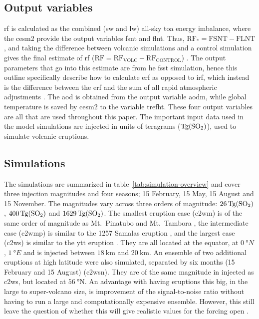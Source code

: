 \documentclass{ametsocV6.1}
\newcommand{\iso}[1][i]{{#1}njected \ce{SO2}}
\begin{document}
\subsection{Output variables}

\gls{rf} is calculated as the combined (\gls{sw} and \gls{lw}) all-sky \gls{toa} energy
imbalance, where the \gls{cesm2} provide the output variables \gls{fsnt} and \gls{flnt}.
Thus, \(\mathrm{RF_*}= \mathrm{FSNT} - \mathrm{FLNT}\), and taking the difference
between volcanic simulations and a control simulation gives the final estimate of
\gls{rf} (\(\mathrm{RF}=\mathrm{RF_{VOLC}}-\mathrm{RF_{CONTROL}}\))
\citep{marshall2020}. The output parameters that go into this estimate are from he
\gls{fsst} simulation, hence this outline specifically describe how to calculate
\gls{erf} as opposed to \gls{irf}, which instead is the difference between the \gls{erf}
and the sum of all rapid atmospheric adjustments \citep{marshall2020,smith2018}. The
\gls{aod} is obtained from the output variable \gls{aodm}, while global temperature is
saved by \gls{cesm2} to the variable \gls{trefht}. These four output variables are all
that are used throughout this paper. The important input data used in the model
simulations are \iso{} in units of teragrams (\(\si{\tera\gram(\ce{SO2})}\)), used to
simulate volcanic eruptions.

\subsection{Simulations}

The simulations are summarized in table~\ref{tab:simulation-overview} and cover three
 injection magnitudes and four seasons; 15 February, 15 May, 15 August and 15
November. The magnitudes vary across three orders of magnitude:
\(\SI{26}{\tera\gram(\ce{SO2})}\), \(\SI{400}{\tera\gram(\ce{SO2})}\) and
\(\SI{1629}{\tera\gram(\ce{SO2})}\). The smallest eruption case (\gls{c2wm}) is of the
same order of magnitude as Mt.\ Pinatubo
\citep[\(\sim10\)--\(\SI{20}{\tera\gram(\ce{SO2})}\);~e.g.][]{timmreck2018} and Mt.\
Tambora \citep[\(\sim\SI{56.2}{\tera\gram(\ce{SO2})}\);~e.g.][]{zanchettin2016}, the
intermediate case (\gls{c2wmp}) is similar to the 1257 Samalas eruption
\citep[\(\sim{118.8}\)--\(\SI{173.1}{\tera\gram(\ce{SO2})}\);~e.g.][]{toohey2017,ottobliesner2016},
and the largest case (\gls{c2ws}) is similar to the \gls{ytt} eruption
\citep[\(100\)--\(\SI{10000}{\tera\gram()}\);~e.g.][]{jones2005}. They are all
located at the equator, at \(\SI{0}{\degree N}\), \(\SI{1}{\degree E}\) and \ce{SO2} is
injected between \(\SI{18}{\kilo\meter}\) and \(\SI{20}{\kilo\meter}\). An ensemble of
two additional eruptions at high latitude were also simulated, separated by six months
(15 February and 15 August) (\gls{c2wsn}). They are of the same magnitude in \iso{} as
\gls{c2ws}, but located at \(\SI{56}{\degree \mathrm{N}}\). An advantage with having
eruptions this big, in the large to super-volcano size, is improvement of the
signal-to-noise ratio without having to run a large and computationally expensive
ensemble. However, this still leave the question of whether this will give realistic
values for the forcing open \citep{gregory2016}.
\end{document}
